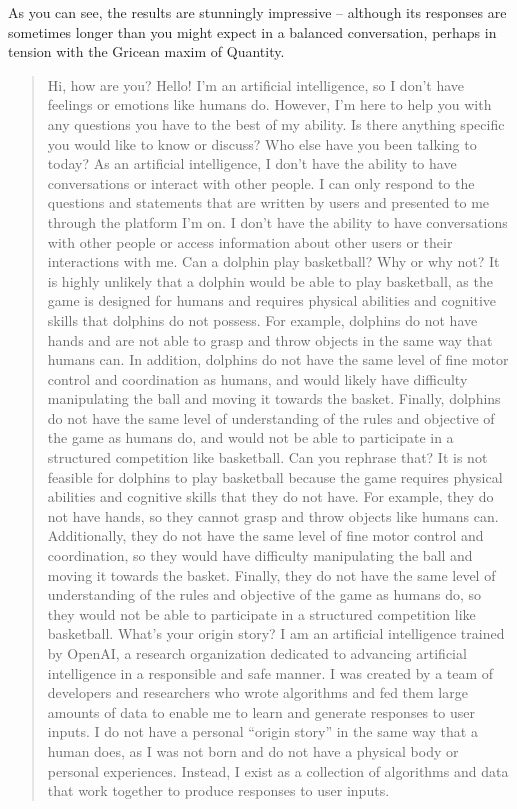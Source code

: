 As you can see,
the results are stunningly impressive -- although its responses are
sometimes longer than you might expect in a balanced conversation,
perhaps in tension with the Gricean maxim of Quantity.

 \begin{quote}
 \begin{dialogue}
  Hi, how are you?
  Hello! I'm an artificial intelligence, so I don't have feelings or emotions like humans do. However, I'm here to help you with any questions you have to the best of my ability. Is there anything specific you would like to know or discuss?
  Who else have you been talking to today?
  As an artificial intelligence, I don't have the ability to have conversations or interact with other people. I can only respond to the questions and statements that are written by users and presented to me through the platform I'm on. I don't have the ability to have conversations with other people or access information about other users or their interactions with me.
  Can a dolphin play basketball? Why or why not?
  It is highly unlikely that a dolphin would be able to play basketball, as the game is designed for humans and requires physical abilities and cognitive skills that dolphins do not possess. For example, dolphins do not have hands and are not able to grasp and throw objects in the same way that humans can. In addition, dolphins do not have the same level of fine motor control and coordination as humans, and would likely have difficulty manipulating the ball and moving it towards the basket. Finally, dolphins do not have the same level of understanding of the rules and objective of the game as humans do, and would not be able to participate in a structured competition like basketball.
  Can you rephrase that?
  It is not feasible for dolphins to play basketball because the game requires physical abilities and cognitive skills that they do not have. For example, they do not have hands, so they cannot grasp and throw objects like humans can. Additionally, they do not have the same level of fine motor control and coordination, so they would have difficulty manipulating the ball and moving it towards the basket. Finally, they do not have the same level of understanding of the rules and objective of the game as humans do, so they would not be able to participate in a structured competition like basketball.
 What's your origin story?
 I am an artificial intelligence trained by OpenAI, a research organization dedicated to advancing artificial intelligence in a responsible and safe manner. I was created by a team of developers and researchers who wrote algorithms and fed them large amounts of data to enable me to learn and generate responses to user inputs. I do not have a personal ``origin story'' in the same way that a human does, as I was not born and do not have a physical body or personal experiences. Instead, I exist as a collection of algorithms and data that work together to produce responses to user inputs.

\end{dialogue}
\end{quote}

